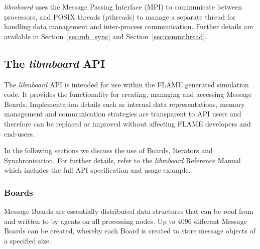 \textit{libmboard} uses the Message Passing Interface (MPI) to communicate between processors, and POSIX threads (pthreads) to manage a separate thread for handling data management and inter-process communication. Further details are available in Section~\ref{sec:mb_sync} and Section~\ref{sec:commthread}.

\subsection{The \textit{libmboard} API}
\label{sec:mb_api}

The  \textit{libmboard} API is intended for use within the FLAME generated simulation code. It provides the functionality for creating, managing and accessing Message Boards. Implementation details such as internal data representations, memory management and communication strategies are transparent to API users and therefore can be replaced or improved without affecting FLAME developers and end-users.

In the following sections we discuss the use of Boards, Iterators and Synchronisation. For further details, refer to the \textit{libmboard} Reference Manual\cite{MessageBoardAPI} which includes the full API specification and usage example.


\subsubsection{Boards}

Message Boards are essentially distributed data structures that can be read from and written to by agents on all processing nodes. Up to 4096 different Message Boards can be created, whereby each Board is created to store message objects of a specified size.

